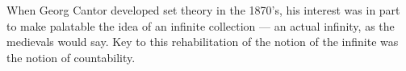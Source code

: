 \documentclass[../../include/open-logic-section]{subfiles}
\begin{document}


When Georg Cantor developed set theory in the 1870's, his 
interest was in part to make palatable the idea of an infinite 
collection --- an actual infinity, as the medievals would say. 
Key to this rehabilitation of the notion of the infinite was the 
notion of countability. 
\end{document}

